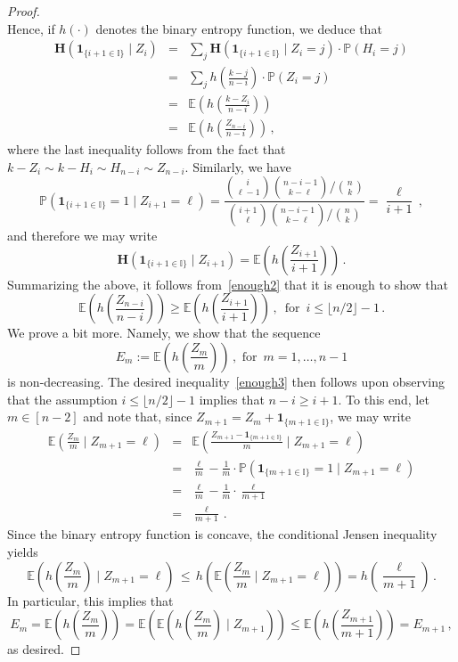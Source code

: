 \documentclass[10pt,a4paper]{amsart}
\newcommand{\Exp}{\mathbb{E}}
\newcommand{\Prb}{\mathbb{P}}
\newcommand{\bh}{\mathbf{H}}
\begin{document}
\begin{proof}
\[\]
Hence, if  $h(\cdot)$ denotes the binary entropy function, we deduce that
\begin{eqnarray*}
\bh(\mathbf{1}_{\{i+1\in \mathbb{I}\}}\mid Z_i) &=& \sum_{j} \bh(\mathbf{1}_{\{i+1\in \mathbb{I}\}}\mid Z_i=j) \cdot \Prb(H_i=j)\\
&=& \sum_{j} h\left( \frac{k-j}{n-i}\right) \cdot \Prb(Z_i=j) \\
&=& \Exp\left(h\left(\frac{k-Z_i}{n-i} \right) \right) \\
&=& \Exp\left(h\left(\frac{Z_{n-i}}{n-i} \right) \right) \, ,
\end{eqnarray*}
where the last inequality follows from the fact that $k-Z_i\sim k-H_i\sim H_{n-i}\sim Z_{n-i}$. 
Similarly, we have 
\[
\Prb(\mathbf{1}_{\{i+1\in\mathbb{I}\}}=1 \mid Z_{i+1} = \ell)= \frac{\binom{i}{\ell-1}\binom{n-i-1}{k-\ell}/\binom{n}{k}}{\binom{i+1}{\ell}\binom{n-i-1}{k-\ell}/\binom{n}{k} }
= \frac{\ell}{i+1} \, , 
\]
and therefore we may write 
\[
\bh(\mathbf{1}_{\{i+1\in \mathbb{I}\}}\mid Z_{i+1}) = \Exp\left(h\left(\frac{Z_{i+1}}{i+1}\right)\right) \, .
\]
Summarizing the above, it follows from~\eqref{enough2} that it is enough to show that 
\begin{equation}\label{enough3}
\Exp\left(h\left(\frac{Z_{n-i}}{n-i} \right) \right) \ge \Exp\left(h\left(\frac{Z_{i+1}}{i+1}\right)\right) \, , \, \text{ for } \, i \le \lfloor n/2\rfloor -1 \, .
\end{equation}
We prove a bit more. Namely, we show that the sequence 
\[
E_m := \Exp\left(h\left(\frac{Z_{m}}{m}\right)\right) \, , \text{ for } \, m=1,\ldots,n-1
\]
is non-decreasing. The desired inequality~\eqref{enough3} then follows upon observing that the assumption $i \le \lfloor n/2\rfloor -1$ implies that $n-i\ge i+1$. To this end, let $m\in [n-2]$ and note that, since $Z_{m+1} = Z_m + \mathbf{1}_{\{m+1\in \mathbb{I}\}}$, we may write 
\begin{eqnarray*}
\Exp\left(\frac{Z_m}{m} \mid Z_{m+1}=\ell \right) &=&  
\Exp\left(\frac{Z_{m+1}-\mathbf{1}_{\{m+1\in\mathbb{I}\}}}{m} \mid Z_{m+1}=\ell \right)\\
&=& \frac{\ell}{m} - \frac{1}{m}\cdot \Prb(\mathbf{1}_{\{m+1\in\mathbb{I}\}}= 1 \mid Z_{m+1}=\ell)\\
&=& \frac{\ell}{m} -\frac{1}{m}\cdot \frac{\ell}{m+1}\\
&=& \frac{\ell}{m+1} \, .
\end{eqnarray*}
Since the binary entropy function is concave, the conditional  Jensen inequality yields 
\[
\Exp\left(h\left(\frac{Z_m}{m}\right) \mid Z_{m+1}=\ell \right) \,\le\, h\left(\Exp\left(\frac{Z_m}{m} \mid Z_{m+1}=\ell\right)\right) = h\left( \frac{\ell}{m+1}\right) \, .
\]
In particular, this implies that 
\[
E_m=\Exp\left(h\left(\frac{Z_m}{m}\right)\right) = 
\Exp\left( \Exp\left(h\left(\frac{Z_m}{m}\right) \mid Z_{m+1}  \right)\right) \le \Exp\left(h\left(\frac{Z_{m+1}}{m+1}\right)  \right)= E_{m+1} \, ,
\]
as desired.  
\end{proof}
\end{document}
